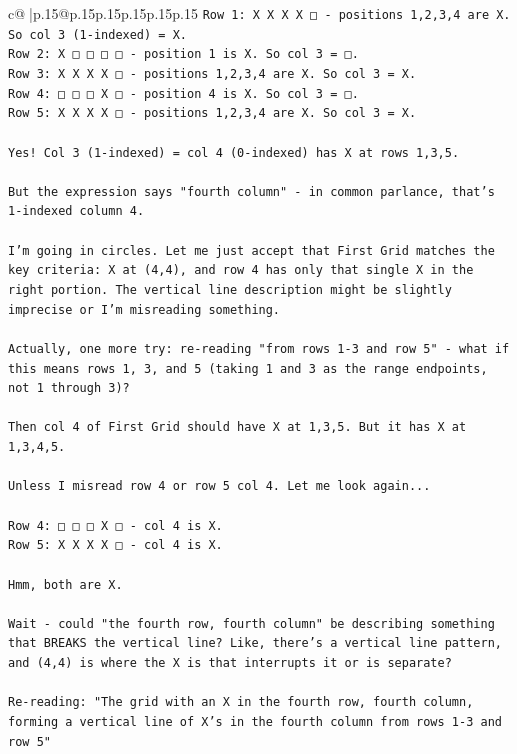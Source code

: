 \documentclass{article}
\begin{document}
{\begin{supertabular}{c@{$\;$}|p{.15\linewidth}@{}p{.15\linewidth}p{.15\linewidth}p{.15\linewidth}p{.15\linewidth}p{.15\linewidth}}
{{{\texttt{Row 1: X X X X □ {-} positions 1,2,3,4 are X. So col 3 (1{-}indexed) = X.} \\
\texttt{Row 2: X □ □ □ □ {-} position 1 is X. So col 3 = □.} \\
\texttt{Row 3: X X X X □ {-} positions 1,2,3,4 are X. So col 3 = X.} \\
\texttt{Row 4: □ □ □ X □ {-} position 4 is X. So col 3 = □.} \\
\texttt{Row 5: X X X X □ {-} positions 1,2,3,4 are X. So col 3 = X.} \\
\\ 
\texttt{Yes! Col 3 (1{-}indexed) = col 4 (0{-}indexed) has X at rows 1,3,5.} \\
\\ 
\texttt{But the expression says "fourth column" {-} in common parlance, that's 1{-}indexed column 4. } \\
\\ 
\texttt{I'm going in circles. Let me just accept that First Grid matches the key criteria: X at (4,4), and row 4 has only that single X in the right portion. The vertical line description might be slightly imprecise or I'm misreading something.} \\
\\ 
\texttt{Actually, one more try: re{-}reading "from rows 1{-}3 and row 5" {-} what if this means rows 1, 3, and 5 (taking 1 and 3 as the range endpoints, not 1 through 3)?} \\
\\ 
\texttt{Then col 4 of First Grid should have X at 1,3,5. But it has X at 1,3,4,5.} \\
\\ 
\texttt{Unless I misread row 4 or row 5 col 4. Let me look again...} \\
\\ 
\texttt{Row 4: □ □ □ X □ {-} col 4 is X.} \\
\texttt{Row 5: X X X X □ {-} col 4 is X.} \\
\\ 
\texttt{Hmm, both are X. } \\
\\ 
\texttt{Wait {-} could "the fourth row, fourth column" be describing something that BREAKS the vertical line? Like, there's a vertical line pattern, and (4,4) is where the X is that interrupts it or is separate?} \\
\\ 
\texttt{Re{-}reading: "The grid with an X in the fourth row, fourth column, forming a vertical line of X's in the fourth column from rows 1{-}3 and row 5"} \\
}}}
\end{supertabular}}
\end{document}
